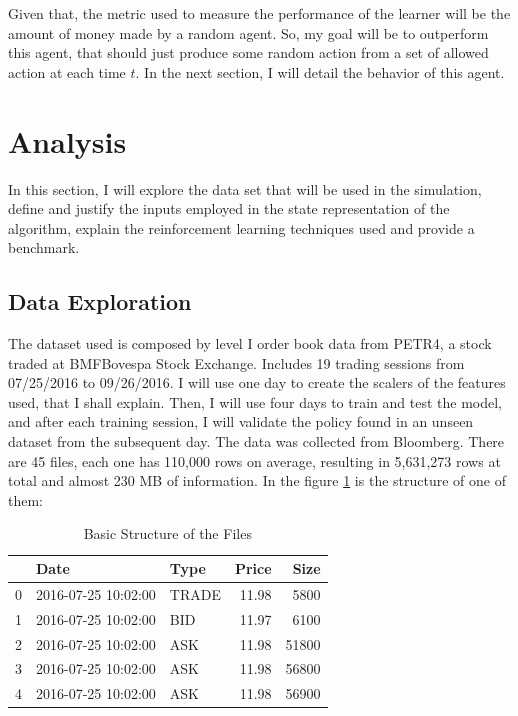 \documentclass[a4paper]{article}
\begin{document}
Given that, the metric used to measure the performance of the learner will be the amount of money made by a random agent. So, my goal will be to outperform this agent, that should just produce some random action from a set of allowed action at each time $t$. In the next section, I will detail the behavior of this agent.


\section{Analysis}
\label{sec:analysis}

In this section, I will explore the data set that will be used in the simulation, define and justify the inputs employed in the state representation of the algorithm, explain the reinforcement learning techniques used and provide a benchmark.

\subsection{Data Exploration}
The dataset used is composed by level I order book data from PETR4, a stock traded at BMFBovespa Stock Exchange. Includes 19 trading sessions from 07/25/2016 to 09/26/2016. I will use one day to create the scalers of the features used, that I shall explain. Then, I will use four days to train and test the model, and after each training session, I will validate the policy found in an unseen dataset from the subsequent day. The data was collected from Bloomberg. There are 45 files, each one has 110,000 rows on average, resulting in 5,631,273 rows at total and almost  230 MB of information. In the figure \ref{tab:original_data} is the structure of one of them:

\begin{table}[ht!]
\centering
\begin{tabular}{l|llrr}
{} &                Date &   Type &  Price &   Size \\
\midrule
0 & 2016-07-25 10:02:00 &  TRADE &  11.98 &   5800 \\
1 & 2016-07-25 10:02:00 &    BID &  11.97 &   6100 \\
2 & 2016-07-25 10:02:00 &    ASK &  11.98 &  51800 \\
3 & 2016-07-25 10:02:00 &    ASK &  11.98 &  56800 \\
4 & 2016-07-25 10:02:00 &    ASK &  11.98 &  56900 \\

\end{tabular}
\caption{\label{tab:original_data}Basic Structure of the Files}
\end{table}
\end{document}
